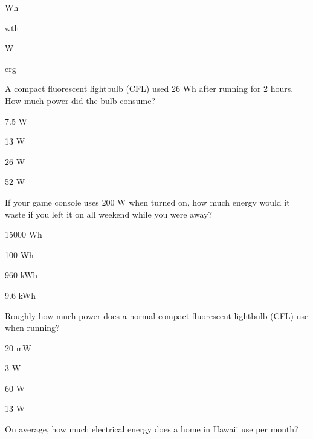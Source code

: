 \documentclass[11pt]{article}
\begin{document}
\begin{answer}
	\item Wh
	\item wth
	\item W
	\item erg
\end{answer}

\pagebreak

\begin{question}
	\item A compact fluorescent lightbulb (CFL) used 26 Wh after running for 2 hours. How much power did the bulb consume?
\end{question}

\begin{answer}
	\item 7.5 W
	\item 13 W
	\item 26 W
	\item 52 W
\end{answer}

\begin{question}
	\item If your game console uses 200 W when turned on, how much energy would it waste if you left it on all weekend while you were away?
\end{question}

\begin{answer}
	\item 15000 Wh
	\item 100 Wh
	\item 960 kWh
	\item 9.6 kWh
\end{answer}

\begin{question}
	\item Roughly how much power does a normal compact fluorescent lightbulb (CFL) use when running?
\end{question}

\begin{answer}
	\item 20 mW
	\item 3 W
	\item 60 W
	\item 13 W
\end{answer}

\begin{question}
	\item On average, how much electrical energy does a home in Hawaii use per month?
\end{question}
\end{document}
